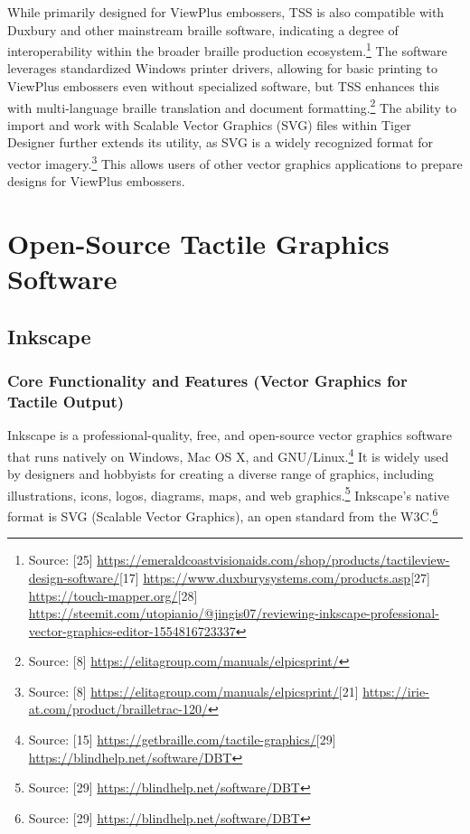 While primarily designed for ViewPlus embossers, TSS is also compatible with Duxbury and other mainstream braille software, indicating a degree of interoperability within the broader braille production ecosystem.\footnote{Source: [25] \url{https://emeraldcoastvisionaids.com/shop/products/tactileview-design-software/}[17] \url{https://www.duxburysystems.com/products.asp}[27] \url{https://touch-mapper.org/}[28] \url{https://steemit.com/utopianio/@jingis07/reviewing-inkscape-professional-vector-graphics-editor-1554816723337}} The software leverages standardized Windows printer drivers, allowing for basic printing to ViewPlus embossers even without specialized software, but TSS enhances this with multi-language braille translation and document formatting.\footnote{Source: [8] \url{https://elitagroup.com/manuals/elpicsprint/}} The ability to import and work with Scalable Vector Graphics (SVG) files within Tiger Designer further extends its utility, as SVG is a widely recognized format for vector imagery.\footnote{Source: [8] \url{https://elitagroup.com/manuals/elpicsprint/}[21] \url{https://irie-at.com/product/brailletrac-120/}} This allows users of other vector graphics applications to prepare designs for ViewPlus embossers.

\section{Open-Source Tactile Graphics Software}

\subsection{Inkscape}

\subsubsection{Core Functionality and Features (Vector Graphics for Tactile Output)}

Inkscape is a professional-quality, free, and open-source vector graphics software that runs natively on Windows, Mac OS X, and GNU/Linux.\footnote{Source: [15] \url{https://getbraille.com/tactile-graphics/}[29] \url{https://blindhelp.net/software/DBT}} It is widely used by designers and hobbyists for creating a diverse range of graphics, including illustrations, icons, logos, diagrams, maps, and web graphics.\footnote{Source: [29] \url{https://blindhelp.net/software/DBT}} Inkscape's native format is SVG (Scalable Vector Graphics), an open standard from the W3C.\footnote{Source: [29] \url{https://blindhelp.net/software/DBT}}

